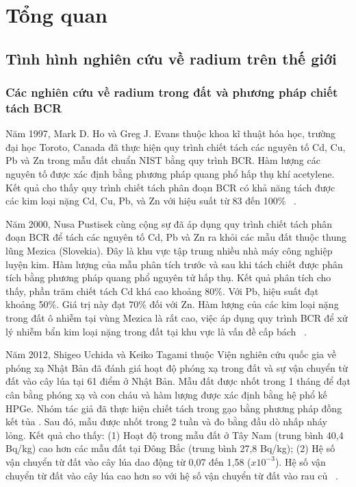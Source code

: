 ﻿\chapter{Tổng quan}

\section{Tình hình nghiên cứu về radium trên thế giới}
    \subsection{Các nghiên cứu về radium trong đất và phương pháp chiết tách BCR}

Năm 1997, Mark D. Ho và Greg J. Evans thuộc khoa kĩ thuật hóa học, trường đại học Toroto, Canada đã thực hiện quy trình chiết tách các nguyên tố Cd, Cu, Pb và Zn trong mẫu đất chuẩn NIST bằng quy trình BCR. Hàm lượng các nguyên tố được xác định bằng phương pháp quang phổ hấp thụ khí acetylene. Kết quả cho thấy quy trình chiết tách phân đoạn BCR có khả năng tách được các kim loại nặng Cd, Cu, Pb, và Zn với hiệu suất từ 83 đến 100\% ~\cite{BCR:MarkD.Ho}.

Năm 2000, Nusa Pustisek cùng cộng sự đã áp dụng quy trình chiết tách phân đoạn BCR để tách các nguyên tố Cd, Pb và Zn ra khỏi các mẫu đất thuộc thung lũng Mezica (Slovekia). Đây là khu vực tập trung nhiều nhà máy công nghiệp luyện kim. Hàm lượng của mẫu phân tích trước và sau khi tách chiết được phân tích bằng phương pháp quang phổ nguyên tử hấp thụ. Kết quả phân tích cho thấy, phần trăm chiết tách Cd khá cao khoảng 80\%. Với Pb, hiệu suất đạt khoảng 50\%. Giá trị này đạt 70\% đối với Zn. Hàm lượng của các kim loại nặng trong đất ô nhiễm tại vùng Mezica là rất cao, việc áp dụng quy trình BCR để xử lý nhiễm bẩn kim loại nặng trong đất tại khu vực là vấn đề cấp bách  ~\cite{BCR:OrginNusa}.

Năm 2012, Shigeo Uchida và Keiko Tagami thuộc Viện nghiên cứu quốc gia về phóng xạ Nhật Bản đã đánh giá hoạt độ phóng xạ  trong đất và sự vận chuyển  từ đất vào cây lúa tại 61 điểm ở Nhật Bản. Mẫu đất được nhốt trong 1 tháng để đạt cân bằng phóng xạ  và con cháu và hàm lượng được xác định bằng hệ phổ kế HPGe. Nhóm tác giả đã thực hiện chiết tách  trong gạo bằng phương pháp đồng kết tủa .  Sau đó, mẫu được nhốt trong 2 tuần và đo bằng đầu dò nhấp nháy lỏng. Kết quả cho thấy: (1) Hoạt độ  trong mẫu đất ở Tây Nam (trung bình 40,4 Bq/kg) cao hơn các mẫu đất tại Đông Bắc (trung bình 27,8 Bq/kg); (2) Hệ số vận chuyển  từ đất vào cây lúa dao động từ 0,07 đến 1,58 ($x10^{-3}$). Hệ số vận chuyển  từ đất vào cây lúa cao hơn so với hệ số vận chuyển từ đất vào rau củ ~\cite{RaSoil:ShigeoUCHIDA}. 

